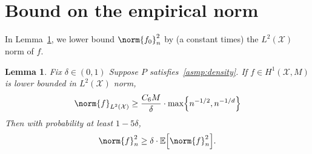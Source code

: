 \documentclass[twoside]{article}
\newcommand{\1}{\mathbf{1}}
\newcommand{\Xset}{\mathcal{X}}
\newcommand{\Leb}{L}
\newcommand{\Ebb}{\mathbb{E}}
\newtheorem{lemma}{Lemma}
\theoremstyle{definition}
\theoremstyle{remark}
\begin{document}
\section{Bound on the empirical norm}
\label{sec:empirical_norm}

In Lemma~\ref{lem:empirical_norm_sobolev}, we lower bound $\norm{f_0}_n^2$ by (a constant times) the $\Leb^2(\Xset)$ norm of $f$.

\begin{lemma}
	\label{lem:empirical_norm_sobolev}
	Fix $\delta \in (0,1)$ Suppose $P$ satisfies~\ref{asmp:density}. If $f \in H^1(\Xset,M)$ is lower bounded in $\Leb^2(\Xset)$ norm,
	\begin{equation}
	\label{eqn:empirical_norm_sobolev_1}
	\norm{f}_{\Leb^2(\Xset)} \geq \frac{C_6 M}{\delta} \cdot \max\Bigl\{n^{-1/2},n^{-1/d}\Bigr\}
	\end{equation}
	Then with probability at least $1 - 5 \delta$,
	\begin{equation}
	\label{eqn:empirical_norm_sobolev}
	\norm{f}_n^2 \geq \delta \cdot \Ebb\Bigl[\norm{f}_n^2\Bigr].
	\end{equation}
\end{lemma}
\end{document}
